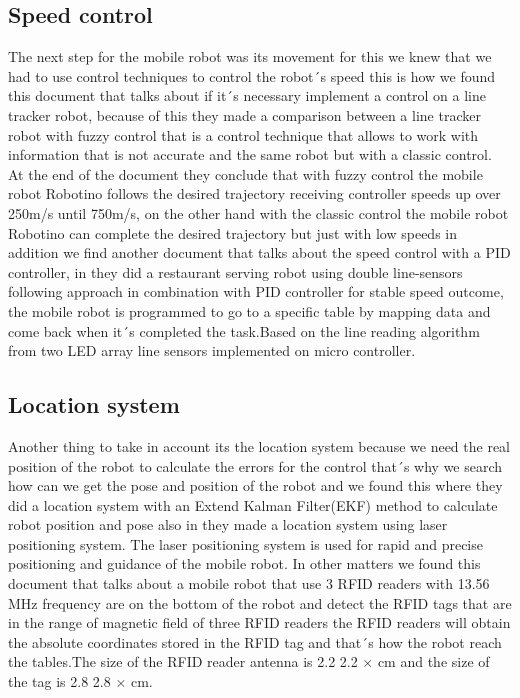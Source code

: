 
\subsection{Speed control}
The next step for the mobile robot was its movement for this we knew that we had to use control techniques to control the robot´s speed this is how we found this document \citep{abril2012analisis} that talks about if it´s necessary implement a control on a line tracker robot, because of this they made a comparison between a line tracker robot with fuzzy control that is a control technique that allows to work with information that is not accurate and the same robot but with a classic control. At the end of the document they conclude that with fuzzy control the mobile robot Robotino follows the desired trajectory receiving controller speeds up over 250m/s until 750m/s, on the other hand with the classic control the mobile robot Robotino can complete the desired trajectory but just with low speeds in addition we find another document that talks about the speed control with a PID controller, in \citep{thanh2019restaurant} they did a restaurant serving robot using double line-sensors following approach in combination with PID controller for stable speed outcome, the mobile robot is programmed to go to a specific table by mapping data and come back when it´s completed the task.Based on the line reading algorithm from two LED array line sensors implemented on micro controller.

\subsection{Location system}
Another thing to take in account its the location system because we need the real position of the robot to calculate the errors for the control that´s why we search how can we get the pose and position of the robot and we found this\citep{yuan2016rgb} where they did a location system with an Extend Kalman Filter(EKF) method to calculate robot position and pose also in \citep{tzou2009high} they made a location system using laser positioning system. The laser positioning system is used for rapid and precise positioning and guidance of the mobile robot. In other matters we found this document \citep{oltean2010position} that talks about a mobile robot that use 3 RFID readers with 13.56 MHz frequency are on the bottom of the robot and detect the RFID tags that are in the range of magnetic field of three RFID readers the RFID readers will obtain the absolute coordinates stored in the RFID tag and that´s how the robot reach the tables.The size of the RFID reader antenna
is 2.2 2.2 × cm and the size of the tag is 2.8 2.8 × cm.




